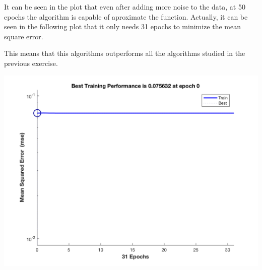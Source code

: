\documentclass[10pt]{article}
\begin{document}
\begin{multicols}{2}
It can be seen in the plot that even after adding more noise to the data, at 50 epochs the algorithm is capable of 
aproximate the function. Actually, it can be seen in the following plot that it only needs 31 epochs to minimize the mean square error.

This means that this algorithms outperforms all the algorithms studied in the previous exercise.

\includegraphics[width=.7\linewidth]{img/errBR}


\end{multicols}
\end{document}
